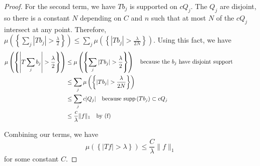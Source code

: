 \documentclass[a4paper]{article}
\newcommand{\supp}[1]{\mathop{\mathrm{supp}}\left(#1\right)}
\begin{document}
\begin{enumerate}
\begin{proof}
    For the second term, we have $Tb_j$ is supported on $c Q_j$. The $Q_j$ are disjoint, so there is a constant $N$ depending on $C$ and $n$ such that
    at most $N$ of the $c Q_j$ intersect at any point. Therefore, ${ \mu \left( \left\{ \sum_j |Tb_j| > \frac{\lambda}{2} \right \} \right) \leq \sum_j
    \mu \left( \left\{ |Tb_j| > \frac{\lambda}{2N} \right\} \right) }$. Using this fact, we have
    \begin{align*}
      \mu \left( \left\{ \left| T \sum_j b_j \right| > \frac{\lambda}{2} \right\} \right) &\leq \mu \left( \left\{ \sum_j | T b_j | >
        \frac{\lambda}{2} \right\} \right) \quad \parbox{7cm}{because the $b_j$ have disjoint support} \\
      &\leq \sum_j \mu \left( \left\{ |T b_j | > \frac{\lambda}{2N} \right\} \right) \\
      &\leq \sum_j c |Q_j| \quad \parbox{5cm}{because $\supp{Tb_j} \subset c Q_j$} \\
      &\leq \frac{c}{\lambda} \|f\|_1 \quad \parbox{5cm}{by (f)}
    \end{align*}

    Combining our terms, we have
    \[ \mu \left( \left\{ |Tf| > \lambda \right\} \right) \leq \frac{C}{\lambda} \|f\|_1 \]
    for some constant $C$.

  \end{proof}

\end{enumerate}
\end{document}

